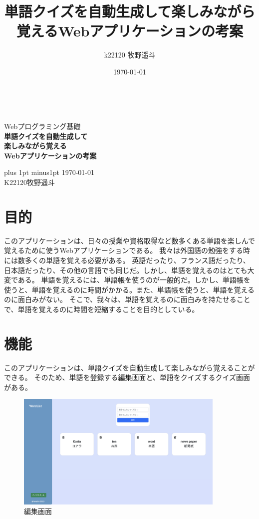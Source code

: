 \documentclass[11pt,a4paper]{jsarticle}
\title{単語クイズを自動生成して楽しみながら覚えるWebアプリケーションの考案}
\author{k22120 牧野遥斗}
\date{\today}
\begin{document}
\begin{titlepage}
    \begin{center}

        \ \vspace{19mm}

        \LARGE\baselineskip=13mm
        Webプログラミング基礎\\[1mm]
        {\Huge\baselineskip=13mm
        \textbf{単語クイズを自動生成して\\楽しみながら覚える\\Webアプリケーションの考案} \\
        }

        \vspace{80mm}

        \kanjiskip=9pt plus 1pt minus1pt
        \today \\
        K22120\hspace{1zw}牧野遥斗 \\
    \end{center}
\end{titlepage}

\section{目的}
このアプリケーションは、日々の授業や資格取得など数多くある単語を楽しんで覚えるために使うWebアプリケーションである。
我々は外国語の勉強をする時には数多くの単語を覚える必要がある。
英語だったり、フランス語だったり、日本語だったり、その他の言語でも同じだ。しかし、単語を覚えるのはとても大変である。
単語を覚えるには、単語帳を使うのが一般的だ。しかし、単語帳を使うと、単語を覚えるのに時間がかかる。また、単語帳を使うと、単語を覚えるのに面白みがない。
そこで、我々は、単語を覚えるのに面白みを持たせることで、単語を覚えるのに時間を短縮することを目的としている。

\section{機能}
このアプリケーションは、単語クイズを自動生成して楽しみながら覚えることができる。
そのため、単語を登録する編集画面と、単語をクイズするクイズ画面がある。

\begin{figure}[htbp]
    \begin{center}
        \includegraphics[width=100mm]{./img/edit_screen.png}
    \end{center}
    \caption{編集画面}
\end{figure}
\end{document}
